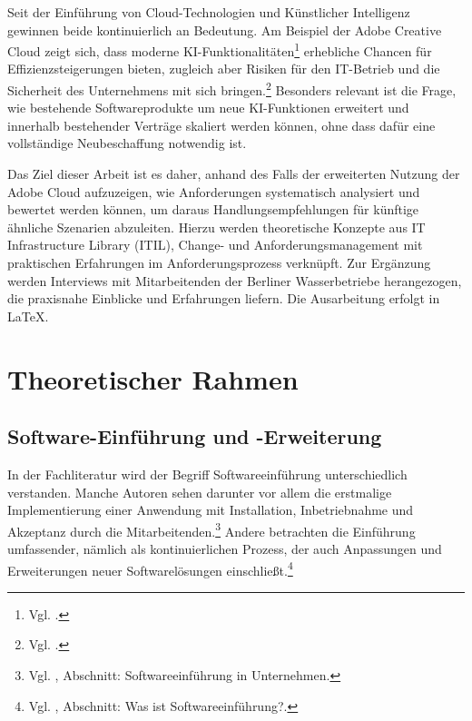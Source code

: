 \documentclass[
    12pt, 
    a4paper,
    ]{scrartcl} %
\begin{document}
Seit der Einführung von Cloud-Technologien und Künstlicher Intelligenz gewinnen beide kontinuierlich an Bedeutung. Am Beispiel der Adobe Creative Cloud zeigt sich, dass moderne KI-Funktionalitäten\footnote{Vgl. \cite{S_AdobeAI}.} erhebliche Chancen für Effizienzsteigerungen bieten, zugleich aber Risiken für den IT-Betrieb und die Sicherheit des Unternehmens mit sich bringen.\footnote{Vgl. \cite{S_Ambient}.} Besonders relevant ist die Frage, wie bestehende Softwareprodukte um neue KI-Funktionen erweitert und innerhalb bestehender Verträge skaliert werden können, ohne dass dafür eine vollständige Neubeschaffung notwendig ist.

Das Ziel dieser Arbeit ist es daher, anhand des Falls der erweiterten Nutzung der Adobe Cloud aufzuzeigen, wie Anforderungen systematisch analysiert und bewertet werden können, um daraus Handlungsempfehlungen für künftige ähnliche Szenarien abzuleiten. Hierzu werden theoretische Konzepte aus IT Infrastructure Library (ITIL), Change- und Anforderungsmanagement mit praktischen Erfahrungen im Anforderungsprozess verknüpft. Zur Ergänzung werden Interviews mit Mitarbeitenden der Berliner Wasserbetriebe herangezogen, die praxisnahe Einblicke und Erfahrungen liefern. Die Ausarbeitung erfolgt in LaTeX.

\section{Theoretischer Rahmen}
\subsection{Software-Einführung und -Erweiterung}
In der Fachliteratur wird der Begriff Softwareeinführung unterschiedlich verstanden. Manche Autoren sehen darunter vor allem die erstmalige Implementierung einer Anwendung mit Installation, Inbetriebnahme und Akzeptanz durch die Mitarbeitenden.\footnote{Vgl. \cite{papershift2022}, Abschnitt: Softwareeinführung in Unternehmen.} Andere betrachten die Einführung umfassender, nämlich als kontinuierlichen Prozess, der auch Anpassungen und Erweiterungen neuer Softwarelösungen einschließt.\footnote{Vgl. \cite{pureconsultant2023}, Abschnitt: Was ist Softwareeinführung?.} 
\end{document}
